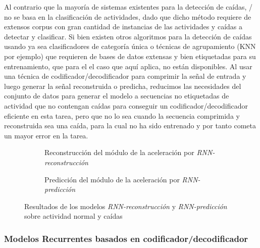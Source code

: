 Al contrario que la mayoría de sistemas existentes para la detección de caídas, \ifell/ no se basa en la clasificación de actividades, dado que dicho método requiere de extensos corpus con gran cantidad de instancias de las actividades y caídas a detectar y clasificar. Si bien existen otros algoritmos  para la detección de caídas usando ya sea clasificadores de categoría única o técnicas de agrupamiento (KNN por ejemplo) que requieren de bases de datos extensas y bien etiquetadas para su entrenamiento, que para el el caso que aquí aplica, no están disponibles. Al usar una técnica de codificador/decodificador para comprimir la señal de entrada y luego generar la señal reconstruida o predicha, reducimos las necesidades del conjunto de datos para generar el modelo a secuencias no etiquetadas de actividad que no contengan caídas para conseguir un codificador/decodificador eficiente en esta tarea, pero que no lo sea cuando la secuencia comprimida y reconstruida sea una caída, para la cual no ha sido entrenado y por tanto cometa un mayor error en la tarea.

\begin{figure}[!ht]
  \centering
  \begin{subfigure}[b]{0.48\textwidth}
      \centering
      \caption{\footnotesize \label{fig:reconstruccionAceleracion}Reconstrucción del módulo de la aceleración por \textit{RNN-reconstrucción}}
  \end{subfigure}
  \hfill
  \begin{subfigure}[b]{0.48\textwidth}
      \centering
      \caption{\footnotesize \label{fig:prediccionAceleracion}Predicción del módulo de la aceleración por \textit{RNN-predicción}}
  \end{subfigure}
  \caption{\small \label{fig:predict:vs:reconst} Resultados de los modelos \textit{RNN-reconstrucción} y \textit{RNN-predicción} sobre actividad normal y caídas}
\end{figure}

\subsubsection{Modelos Recurrentes basados en codificador/decodificador}

